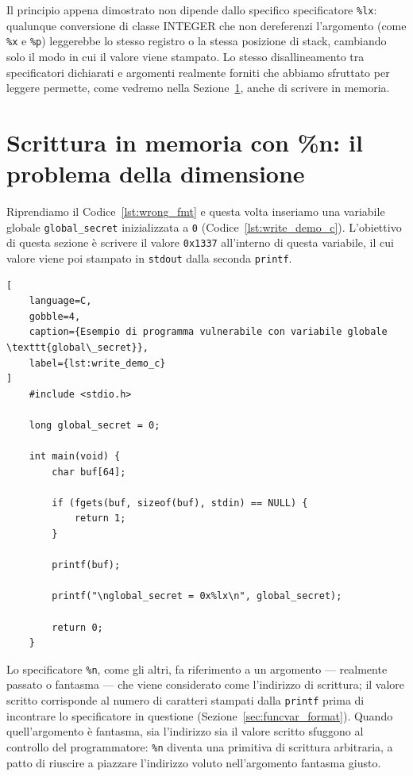 Il principio appena dimostrato non dipende dallo specifico specificatore \texttt{\%lx}: qualunque conversione di classe INTEGER che non dereferenzi l'argomento (come \texttt{\%x} e \texttt{\%p}) leggerebbe lo stesso registro o la stessa posizione di stack, cambiando solo il modo in cui il valore viene stampato. Lo stesso disallineamento tra specificatori dichiarati e argomenti realmente forniti che abbiamo sfruttato per leggere permette, come vedremo nella Sezione~\ref{sec:mem_write}, anche di scrivere in memoria.


\section{Scrittura in memoria con \%n: il problema della dimensione}\label{sec:mem_write}
Riprendiamo il Codice~\ref{lst:wrong_fmt} e questa volta inseriamo una variabile globale \texttt{global\_secret} inizializzata a \texttt{0} (Codice~\ref{lst:write_demo_c}). L'obiettivo di questa sezione è scrivere il valore \texttt{0x1337} all'interno di questa variabile, il cui valore viene poi stampato in \texttt{stdout} dalla seconda \texttt{printf}.
\begin{lstlisting}[
    language=C,
    gobble=4,
    caption={Esempio di programma vulnerabile con variabile globale \texttt{global\_secret}},
    label={lst:write_demo_c}
]
    #include <stdio.h>

    long global_secret = 0;

    int main(void) {
        char buf[64];

        if (fgets(buf, sizeof(buf), stdin) == NULL) {
            return 1;
        }

        printf(buf);

        printf("\nglobal_secret = 0x%lx\n", global_secret);

        return 0;
    }
\end{lstlisting}

Lo specificatore \texttt{\%n}, come gli altri, fa riferimento a un argomento --- realmente passato o fantasma --- che viene considerato come l'indirizzo di scrittura; il valore scritto corrisponde al numero di caratteri stampati dalla \texttt{printf} prima di incontrare lo specificatore in questione (Sezione~\ref{sec:funcvar_format}). Quando quell'argomento è fantasma, sia l'indirizzo sia il valore scritto sfuggono al controllo del programmatore: \texttt{\%n} diventa una primitiva di scrittura arbitraria, a patto di riuscire a piazzare l'indirizzo voluto nell'argomento fantasma giusto.

